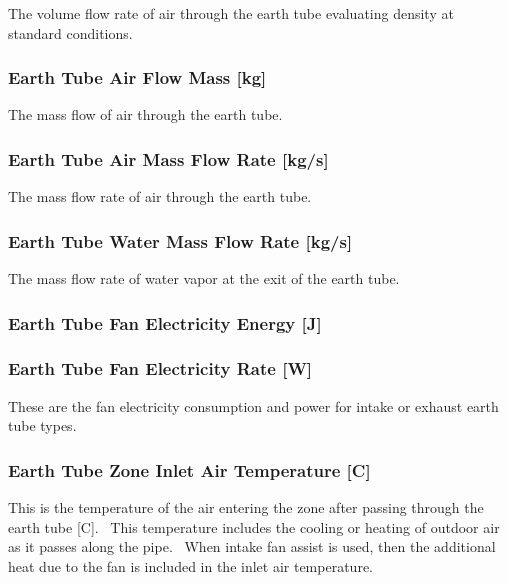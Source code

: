 The volume flow rate of air through the earth tube evaluating density at standard conditions.

\subsubsection{Earth Tube Air Flow Mass {[}kg{]}}\label{earth-tube-air-flow-mass-kg}

The mass flow of air through the earth tube.

\subsubsection{Earth Tube Air Mass Flow Rate {[}kg/s{]}}\label{earth-tube-air-mass-flow-rate-kgs}

The mass flow rate of air through the earth tube.

\subsubsection{Earth Tube Water Mass Flow Rate {[}kg/s{]}}\label{earth-tube-water-mass-flow-rate-kgs}

The mass flow rate of water vapor at the exit of the earth tube.

\subsubsection{Earth Tube Fan Electricity Energy {[}J{]}}\label{earth-tube-fan-electric-energy-j}

\subsubsection{Earth Tube Fan Electricity Rate {[}W{]}}\label{earth-tube-fan-electric-power-w}

These are the fan electricity consumption and power for intake or exhaust earth tube types.

\subsubsection{Earth Tube Zone Inlet Air Temperature {[}C{]}}\label{earth-tube-zone-inlet-air-temperature-c}

This is the temperature of the air entering the zone after passing through the earth tube {[}C{]}.~ This temperature includes the cooling or heating of outdoor air as it passes along the pipe. ~When intake fan assist is used, then the additional heat due to the fan is included in the inlet air temperature.

